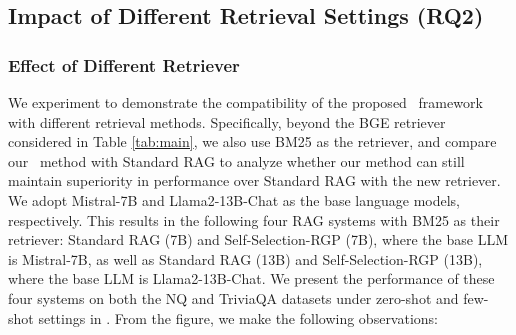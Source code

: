 \subsection{Impact of Different Retrieval Settings (RQ2)}
\subsubsection{\textbf{ Effect of Different Retriever}}
We experiment to demonstrate the compatibility of the proposed \framework~framework with different retrieval methods. 
Specifically, beyond the BGE retriever considered in Table \ref{tab:main}, we also use BM25 as the retriever, and compare our \approach~method with Standard RAG to analyze whether our method can still maintain superiority in performance over Standard RAG with the new retriever.
We adopt Mistral-7B and Llama2-13B-Chat as the base language models, respectively.
This results in the following four RAG systems with BM25 as their retriever: Standard RAG (7B) and Self-Selection-RGP (7B), where the base LLM is Mistral-7B, as well as Standard RAG (13B) and Self-Selection-RGP (13B), where the base LLM is Llama2-13B-Chat.
We present the performance of these four systems on both the NQ and TriviaQA datasets under zero-shot and few-shot settings in .
From the figure, we make the following observations: 

